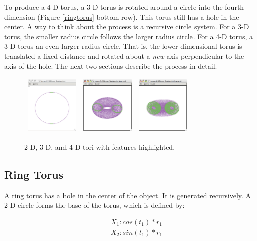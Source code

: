 To produce a 4-D torus, a 3-D torus is rotated around a circle into
the fourth dimension (Figure \ref{ringtorus} bottom row).  This torus
still has a hole in the center.  A way to think about the process is a
recursive circle system. For a 3-D torus, the smaller radius circle
follows the larger radius circle. For a 4-D torus, a 3-D torus an even
larger radius circle.  That is, the lower-dimensional torus is
translated a fixed distance and rotated about a \textit{new} axis
perpendicular to the axis of the hole. The next two sections describe
the process in detail.

\begin{figure}[ht]
\centering
\begin{tabular}{c c c c}
\includegraphics[width=1in]{fig/torus-2-50k.pdf} & \includegraphics[width=1in]{fig/torus-3-50k.pdf} & \includegraphics[width=1in]{fig/torus-4-50k.pdf}
\end{tabular}
\caption{2-D, 3-D, and 4-D tori with features highlighted.}
\end{figure}

\subsection{Ring Torus}

A ring torus has a hole in the center of the object. It is generated
recursively. A 2-D circle forms the base of the torus, which is defined by:

\begin{eqnarray*}
&&X_1: cos(t_1) * r_1\\
&&X_2: sin(t_1) * r_1
\end{eqnarray*}


